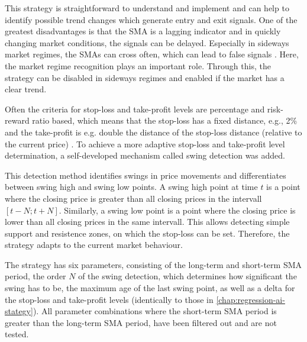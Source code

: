 \noindent
This strategy is straightforward to understand and implement and can help to identify possible trend changes which generate entry and exit signals.
One of the greatest disadvantages is that the SMA is a lagging indicator and in quickly changing market conditions, the signals can be delayed.
Especially in sideways market regimes, the SMAs can cross often, which can lead to false signals \cite{sma-advantage-disadvantage}.
Here, the market regime recognition plays an important role.
Through this, the strategy can be disabled in sideways regimes and enabled if the market has a clear trend.

Often the criteria for stop-loss and take-profit levels are percentage and risk-reward ratio based, which means that the stop-loss has a fixed distance, e.g., 2\% and the take-profit is e.g. double the distance of the stop-loss distance (relative to the current price) \cite{sma-sl-tp}.
To achieve a more adaptive stop-loss and take-profit level determination, a self-developed mechanism called swing detection was added.

This detection method identifies swings in price movements and differentiates between swing high and swing low points.
A swing high point at time $t$ is a point where the closing price is greater than all closing prices in the intervall $[t-N; t+N]$.
Similarly, a swing low point is a point where the closing price is lower than all closing prices in the same intervall.
This allows detecting simple support and resistence zones, on which the stop-loss can be set.
Therefore, the strategy adapts to the current market behaviour.



The strategy has six parameters, consisting of the long-term and short-term SMA period, the order $N$ of the swing detection, which determines how significant the swing has to be, the maximum age of the last swing point, as well as a delta for the stop-loss and take-profit levels (identically to those in \autoref{chap:regression-ai-stategy}).
All parameter combinations where the short-term SMA period is greater than the long-term SMA period, have been filtered out and are not tested.

